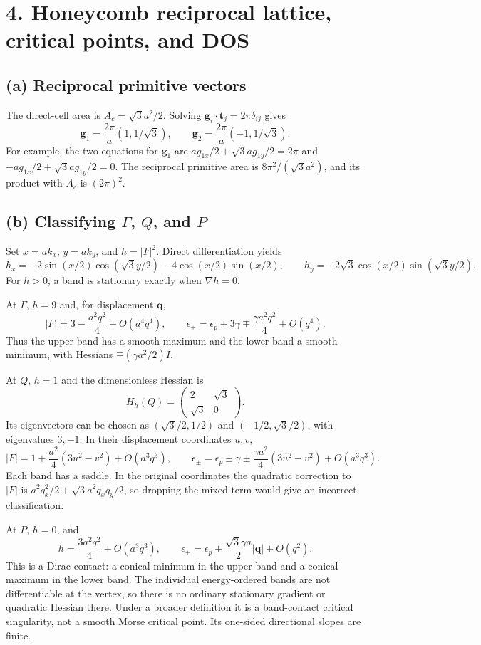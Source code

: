 \section*{4. Honeycomb reciprocal lattice, critical points, and DOS}
\subsection*{(a) Reciprocal primitive vectors}
The direct-cell area is $A_c=\sqrt3a^2/2$. Solving
$\mathbf g_i\cdot\mathbf t_j=2\pi\delta_{ij}$ gives
\[
\boxed{\mathbf g_1=\frac{2\pi}{a}(1,1/\sqrt3),\qquad
\mathbf g_2=\frac{2\pi}{a}(-1,1/\sqrt3).}
\]
For example, the two equations for $\mathbf g_1$ are
$ag_{1x}/2+\sqrt3ag_{1y}/2=2\pi$ and
$-ag_{1x}/2+\sqrt3ag_{1y}/2=0$.
The reciprocal primitive area is $8\pi^2/(\sqrt3a^2)$, and its product with $A_c$ is $(2\pi)^2$.

\subsection*{(b) Classifying $\Gamma$, $Q$, and $P$}
Set $x=ak_x$, $y=ak_y$, and $h=|F|^2$. Direct differentiation yields
\[
h_x=-2\sin(x/2)\cos(\sqrt3y/2)-4\cos(x/2)\sin(x/2),\qquad
h_y=-2\sqrt3\cos(x/2)\sin(\sqrt3y/2).
\]
For $h>0$, a band is stationary exactly when $\nabla h=0$.

At $\Gamma$, $h=9$ and, for displacement $\mathbf q$,
\[
|F|=3-\frac{a^2q^2}{4}+O(a^4q^4),\qquad
\epsilon_\pm=\epsilon_p\pm3\gamma\mp\frac{\gamma a^2q^2}{4}+O(q^4).
\]
Thus the upper band has a smooth maximum and the lower band a smooth minimum, with Hessians $\mp(\gamma a^2/2)I$.

At $Q$, $h=1$ and the dimensionless Hessian is
\[
H_h(Q)=\begin{pmatrix}2&\sqrt3\\\sqrt3&0\end{pmatrix}.
\]
Its eigenvectors can be chosen as $(\sqrt3/2,1/2)$ and $(-1/2,\sqrt3/2)$, with eigenvalues $3,-1$. In their displacement coordinates $u,v$,
\[
|F|=1+\frac{a^2}{4}(3u^2-v^2)+O(a^3q^3),\qquad
\epsilon_\pm=\epsilon_p\pm\gamma\pm\frac{\gamma a^2}{4}(3u^2-v^2)+O(a^3q^3).
\]
Each band has a saddle. In the original coordinates the quadratic correction to $|F|$ is
$a^2q_x^2/2+\sqrt3a^2q_xq_y/2$, so dropping the mixed term would give an incorrect classification.

At $P$, $h=0$, and
\[
h=\frac{3a^2q^2}{4}+O(a^3q^3),\qquad
\epsilon_\pm=\epsilon_p\pm\frac{\sqrt3\gamma a}{2}|\mathbf q|+O(q^2).
\]
This is a Dirac contact: a conical minimum in the upper band and a conical maximum in the lower band. The individual energy-ordered bands are not differentiable at the vertex, so there is no ordinary stationary gradient or quadratic Hessian there. Under a broader definition it is a band-contact critical singularity, not a smooth Morse critical point. Its one-sided directional slopes are finite.

